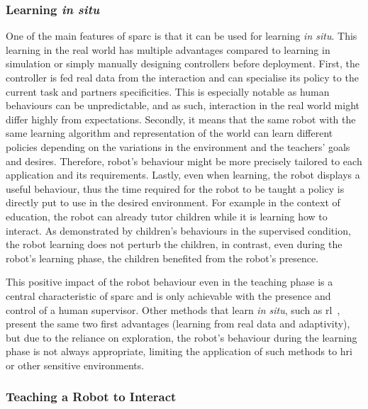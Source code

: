 \subsubsection{Learning \emph{in situ}}

One of the main features of \gls{sparc} is that it can be used for learning \emph{in situ}. This learning in the real world has multiple advantages compared to learning in simulation or simply manually designing controllers before deployment. First, the controller is fed real data from the interaction and can specialise its policy to the current task and partners specificities. This is especially notable as human behaviours can be unpredictable, and as such, interaction in the real world might differ highly from expectations. Secondly, it means that the same robot with the same learning algorithm and representation of the world can learn different policies depending on the variations in the environment and the teachers' goals and desires. Therefore, robot's behaviour might be more precisely tailored to each application and its requirements. Lastly, even when learning, the robot displays a useful behaviour, thus the time required for the robot to be taught a policy is directly put to use in the desired environment. For example in the context of education, the robot can already tutor children while it is learning how to interact. As demonstrated by children's behaviours in the supervised condition, the robot learning does not perturb the children, in contrast, even during the robot's learning phase, the children benefited from the robot's presence. 

This positive impact of the robot behaviour even in the teaching phase is a central characteristic of \gls{sparc} and is only achievable with the presence and control of a human supervisor. Other methods that learn \emph{in situ}, such as \gls{rl}~\citep{sutton1998reinforcement}, present the same two first advantages (learning from real data and adaptivity), but due to the reliance on exploration, the robot's behaviour during the learning phase is not always appropriate, limiting the application of such methods to \gls{hri} or other sensitive environments.

\subsubsection{Teaching a Robot to Interact} \label{sec:tuto_disc_teaching}

